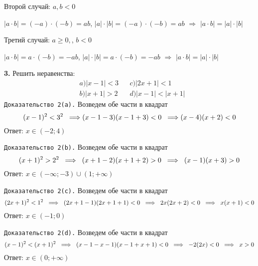 \documentclass[12pt]{article}
\begin{document}
\hspace{-6mm}Второй случай: $a,b<0$\vspace{1mm}

$|a\cdot b| = (-a)\cdot(-b) = ab$, \quad $|a|\cdot|b| = (-a)\cdot(-b) =ab$ $\Longrightarrow$ $|a\cdot b|=|a|\cdot|b|$

\hspace{-6mm}Третий случай: $a\ge0,$, $b<0$\vspace{1mm}

$|a\cdot b| = a\cdot(-b) = -ab$, \quad $|a|\cdot|b| = a\cdot(-b) = -ab$ $\Longrightarrow$ $|a\cdot b| = |a|\cdot|b|$ 
	
	
	\hspace{-2mm}{\it Доказано.}
	
	
{\bf 3.} Решить неравенства:
\begin{align*}
	&a) |x-1|<3 & &c)|2x+1|<1\\
	&b)|x+1|>2 & &d)|x-1|<|x+1|
\end{align*}
	{\tt Доказательство 2(a).} Возведем обе части в квадрат
	\[
		(x-1)^2 <3^2\hspace{2mm}\Longrightarrow(x-1-3)(x-1+3)<0\hspace{2mm}\Longrightarrow(x-4)(x+2)<0
	\]
	Ответ: $x\in(-2; 4)$
	
	{\tt Доказательство 2(b).} Возведем обе части в квадрат
	\[
		(x+1)^2>2^2\hspace{2mm}\Longrightarrow\hspace{2mm}(x+1-2)(x+1+2)>0\hspace{2mm}\Longrightarrow\hspace{2mm}(x-1)(x+3)>0
	\] 
	Ответ: $x\in(-\infty;-3) \cup (1;+\infty)$
	
	{\tt Доказательство 2(c).} Возведем обе части в квадрат
	\[
		(2x+1)^2<1^2\hspace{2mm}\Longrightarrow\hspace{2mm}(2x+1-1)(2x+1+1)<0\hspace{2mm}\Longrightarrow\hspace{2mm}2x(2x+2)<0\hspace{2mm}\Longrightarrow\hspace{2mm}x(x+1)<0
	\]
	Ответ: $x\in (-1;0)$
	
	{\tt Доказательство 2(d).} Возведем обе части в квадрат
	\[
		(x-1)^2<(x+1)^2\hspace{2mm}\Longrightarrow\hspace{2mm}(x-1-x-1)(x-1+x+1)<0\hspace{2mm}\Longrightarrow\hspace{2mm}-2(2x)<0\hspace{2mm}\Longrightarrow\hspace{2mm}x>0
	\]
	Ответ: $x\in(0;+\infty)$\vspace{2mm}
	
\end{document}
